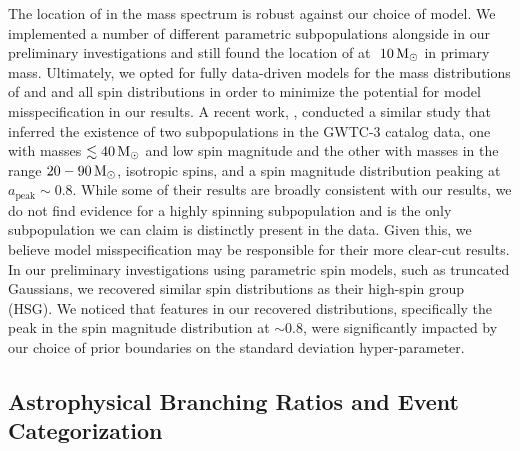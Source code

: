 The location of \first{} in the mass spectrum is robust against our choice of model. We implemented a number of different parametric subpopulations alongside \first{} in our preliminary investigations and still found the location of \first{} at $~10{\,\rm M}_\odot$ in primary mass. Ultimately, we opted for fully data-driven models for the mass distributions of \contA{} and \contB{} and all spin distributions in order to minimize the potential for model misspecification in our results. A recent work, \citet{2303.02973}, conducted a similar study that inferred the existence of two subpopulations in the GWTC-3 catalog data, one with masses $\lesssim 40{\,\rm M}_\odot$ and low spin magnitude and the other with masses in the range $20-90{\,\rm M}_\odot$, isotropic spins, and a spin magnitude distribution peaking at $a_\text{peak} \sim 0.8$. While some of their results are broadly consistent with our results, we do not find evidence for a highly spinning subpopulation and \first{} is the only subpopulation we can claim is distinctly present in the data. Given this, we believe model misspecification may be responsible for their more clear-cut results. In our preliminary investigations using parametric spin models, such as truncated Gaussians, we recovered similar spin distributions as their high-spin group (HSG). We noticed that features in our recovered distributions, specifically the peak in the spin magnitude distribution at $\sim 0.8$, were significantly impacted by our choice of prior boundaries on the standard deviation hyper-parameter.

\subsection{Astrophysical Branching Ratios and Event Categorization}

